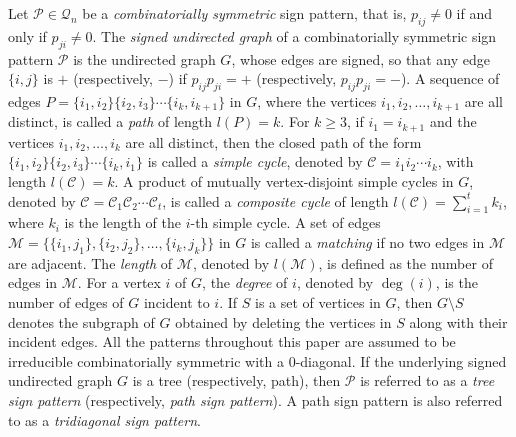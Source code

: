 \documentclass[10pt,a4paper]{amsart}
\numberwithin{equation}{section}
\begin{document}
	
	
	
	Let $\mathcal{P}\in \mathcal{Q}_n$ be a \textit{combinatorially symmetric} sign pattern, that is, $p_{ij}\neq 0$ if and only if $p_{ji}\neq 0$.
	The \textit{signed undirected graph} of a combinatorially symmetric sign pattern $\mathcal{P}$ is the undirected graph $G$, whose edges are signed, so that any edge $\{i,j\}$ is $+$ (respectively, $-$) if $p_{ij}p_{ji} = +$
	(respectively, $p_{ij}p_{ji}=-$). 
	A sequence of edges $P=\{i_1, i_2\} \{i_2, i_3\} \cdots \{i_k, i_{k+1}\}$ in $G$, where the vertices $i_1, i_2, \dots, i_{k+1}$ are all distinct, is called a \textit{path} of length $l(P)=k$.
	For $k \geq 3$, if $i_1 = i_{k+1}$ and the vertices $i_1, i_2, \dots, i_k$ are all distinct, then the closed path of the form $\{i_1, i_2\} \{i_2, i_3\} \cdots \{i_k, i_1\}$ is called a \textit{simple cycle}, denoted by $\mathcal{C} = i_1i_2\cdots i_k$, with length $l(\mathcal{C}) = k$.
	A product of mutually vertex-disjoint simple cycles in $G$, denoted by $\mathcal{C} = \mathcal{C}_1 \mathcal{C}_2 \cdots \mathcal{C}_t$, is called a \textit{composite cycle} of length $l(\mathcal{C})=\sum_{i=1}^{t} k_i$, where $k_i$ is the length of the $i$-th simple cycle. A set of edges $\mathcal{M} = \{\{i_1, j_1\}, \{i_2, j_2\}, \dots, \{i_k, j_k\}\}$ in $G$ is called a \textit{matching} if no two edges in $\mathcal{M}$ are adjacent. The \textit{length} of $\mathcal{M}$, denoted by $l(\mathcal{M})$, is defined as the number of edges in $\mathcal{M}$.
	For a vertex $i$ of $G$, the \textit{degree} of $i$, denoted by $\deg(i)$, is the number of edges of $G$ incident to $i$.
	If $S$ is a set of vertices in $G$, then $G \setminus S$ denotes the subgraph of $ G $ obtained by deleting the vertices in $S$ along with their incident edges.
	All the patterns throughout this paper are assumed to be irreducible combinatorially symmetric with a $0$-diagonal.
	If the underlying signed undirected graph $G$ is a tree (respectively, path), then $\mathcal{P}$ is referred to as a \textit{tree sign pattern} (respectively, \textit{path sign pattern}). A path sign pattern is also referred to as a \textit{tridiagonal sign pattern}.
	
	
\end{document}

